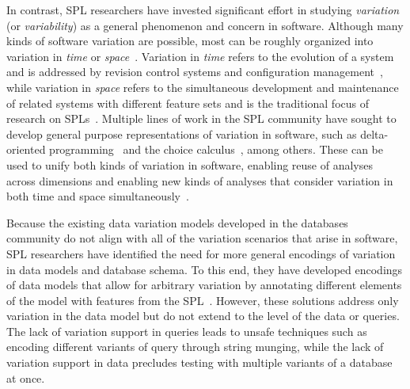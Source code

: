 In contrast, SPL researchers have invested significant effort in studying
\emph{variation} (or \emph{variability}) as a general phenomenon and concern in
software.
%
Although many kinds of software variation are possible, most can be roughly
organized into variation in \emph{time} or \emph{space}~\cite{Thu19vv}.
Variation in \emph{time} refers to the evolution of a system and is addressed
by revision control systems and configuration management~\cite{Dart91}, while
variation in \emph{space} refers to the simultaneous development and
maintenance of related systems with different feature sets and is the
traditional focus of research on SPLs~\cite{FOSPL16}.
%
Multiple lines of work in the SPL community have sought to develop general
purpose representations of variation in software, such as delta-oriented
programming~\cite{Schaefer10dop} and the choice calculus~\cite{EW11tosem},
among others. These can be used to unify both kinds of variation in software,
enabling reuse of analyses across dimensions and enabling new kinds of analyses
that consider variation in both time and space simultaneously~\cite{Thu19vv}.

Because the existing data variation models developed in the databases community
do not align with all of the variation scenarios that arise in software, SPL
researchers have identified the need for more general encodings of variation in
data models and database schema. To this end, they have developed
encodings of data models that allow for arbitrary variation by annotating
different elements of the model with features from the
SPL~\cite{skrhas09DBIS,slrs12CAiSE,ad11varDataModel}.
%
However, these solutions address only variation in the data model but do not
extend to the level of the data or queries. The lack of variation support in
queries leads to unsafe techniques such as encoding different variants of query
through string munging, while the lack of variation support in data precludes
testing with multiple variants of a database at once.

